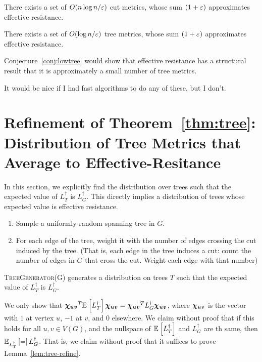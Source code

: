 \begin{conjecture}\label{thm:super-lowcut} There exists a set of $O(n \log n /
  \varepsilon)$ cut metrics, whose sum $(1+\varepsilon)$ approximates effective resistance.
\end{conjecture}
\begin{conjecture}\label{conj:super-lowtree} There exists a set of $O( \log n / \varepsilon)$ tree
  metrics, whose sum $(1+\varepsilon)$ approximates effective resistance.
\end{conjecture}

Conjecture~\ref{conj:lowtree} would show that effective resistance has a structural
result that it is approximately a small number of tree metrics. 

It would be nice if I had fast algorithms to do any of these, but I
don't. 

\section{Refinement of Theorem~\ref{thm:tree}: Distribution of Tree
Metrics that Average to Effective-Resitance}

In this section, we explicitly find the distribution over trees such
that the expected value of $L_T^\dag$ is $L_G^\dag$. This directly implies
a distribution of trees whose expected value is effective resistance.

\begin{algorithm} [H]
  \caption{$\textsc{TreeGenerator(G)}$}
\begin{enumerate}
  \item Sample a uniformly random spanning tree in $G$.
  \item For each edge of the tree, weight it with the number of
    edges crossing the cut induced by the tree. (That is, each edge in
    the tree induces a cut: count the number of edges in $G$ that cross
    the cut. Weight each edge with that number)
\end{enumerate}
\end{algorithm}
\begin{theorem} \label{thm:tree-refine} \textsc{TreeGenerator(G)}
  generates a distribution on
  trees $T$ such that the expected value of $L_T^\dag$ is $L_G^\dag$.
\end{theorem}
%
  We only show that $\boldsymbol{\chi_{uv}}^T {\mathbb{E}}_{}\left[ L_T^\dag \right] \boldsymbol{\chi_{uv}} = \boldsymbol{\chi_{uv}}^T L_G^\dag
  \boldsymbol{\chi_{uv}}$, where $\boldsymbol{\chi_{uv}}$ is the vector with $1$ at vertex $u$, $-1$ at
  $v$, and $0$ elsewhere. We claim without proof that if this holds for
  all $u, v \in V(G)$, and the nullspace of ${\mathbb{E}}_{}\left[ L_T^\dag \right]$ and $L_G^\dag$
  are th same, then ${\mathbb{E}}_{L_T^\dag}\left[ = \right] L_G^\dag$. That is, we claim
  without proof that it
  suffices to prove Lemma~\ref{lem:tree-refine}.

